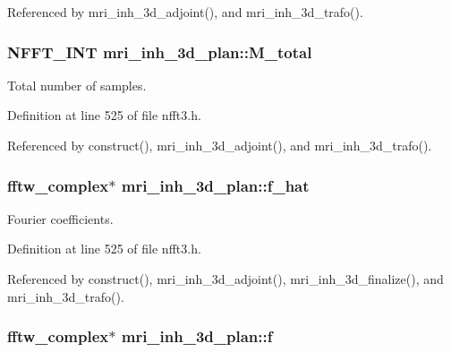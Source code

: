 Referenced by mri\-\_\-inh\-\_\-3d\-\_\-adjoint(), and mri\-\_\-inh\-\_\-3d\-\_\-trafo().

\hypertarget{structmri__inh__3d__plan_a59d7ad3bea791ad7c2c6a808fc1e40fe}{
\subsubsection[{M\-\_\-total}]{\setlength{\rightskip}{0pt plus 5cm}N\-F\-F\-T\-\_\-\-I\-N\-T mri\-\_\-inh\-\_\-3d\-\_\-plan\-::\-M\-\_\-total}}\label{structmri__inh__3d__plan_a59d7ad3bea791ad7c2c6a808fc1e40fe}


Total number of samples. 



Definition at line 525 of file nfft3.\-h.



Referenced by construct(), mri\-\_\-inh\-\_\-3d\-\_\-adjoint(), and mri\-\_\-inh\-\_\-3d\-\_\-trafo().

\hypertarget{structmri__inh__3d__plan_a91ed30b213dea4954d2d27c4d1334a50}{
\subsubsection[{f\-\_\-hat}]{\setlength{\rightskip}{0pt plus 5cm}fftw\-\_\-complex$\ast$ mri\-\_\-inh\-\_\-3d\-\_\-plan\-::f\-\_\-hat}}\label{structmri__inh__3d__plan_a91ed30b213dea4954d2d27c4d1334a50}


Fourier coefficients. 



Definition at line 525 of file nfft3.\-h.



Referenced by construct(), mri\-\_\-inh\-\_\-3d\-\_\-adjoint(), mri\-\_\-inh\-\_\-3d\-\_\-finalize(), and mri\-\_\-inh\-\_\-3d\-\_\-trafo().

\hypertarget{structmri__inh__3d__plan_a9e51f5f4ad46d4b120c452fc962a2385}{
\subsubsection[{f}]{\setlength{\rightskip}{0pt plus 5cm}fftw\-\_\-complex$\ast$ mri\-\_\-inh\-\_\-3d\-\_\-plan\-::f}}\label{structmri__inh__3d__plan_a9e51f5f4ad46d4b120c452fc962a2385}


